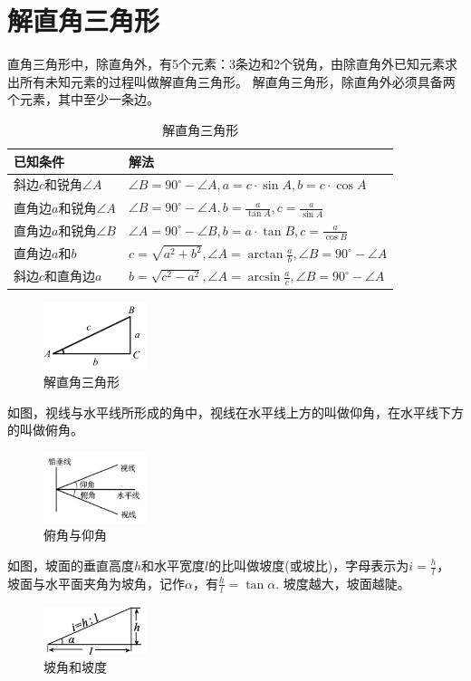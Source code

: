 \documentclass{ecnuthesis}
\begin{document}
\section{解直角三角形}
\begin{knowledge}
    直角三角形中，除直角外，有5个元素：3条边和2个锐角，由除直角外已知元素求出所有未知元素的过程叫做解直角三角形。
    解直角三角形，除直角外必须具备两个元素，其中至少一条边。
\end{knowledge}
\begin{table}[H]
\centering
\caption{解直角三角形}
\begin{tabular}{l|l}
\hline
\hline
已知条件 & 解法 \\
\hline
斜边$c$和锐角$\angle A$ & $\angle B=90^\circ-\angle A,a=c·\sin A,b=c·\cos A$ \\
直角边$a$和锐角$\angle A$ & $\angle B=90^\circ-\angle A,b=\frac{a}{\tan A},c=\frac{a}{\sin A}$ \\
直角边$a$和锐角$\angle B$ & $\angle A=90^\circ-\angle B,b=a·\tan B,c=\frac{a}{\cos B}$ \\
直角边$a$和$b$ & $c=\sqrt{a^2+b^2},\angle A=\arctan \frac{a}{b},\angle B=90^\circ-\angle A$ \\
斜边$c$和直角边$a$ & $b=\sqrt{c^2-a^2},\angle A=\arcsin \frac{a}{c},\angle B=90^\circ-\angle A$ \\
\hline
\hline
\end{tabular}
\end{table}
\begin{figure}[H]
\centering
\includegraphics[width=3cm]{picture/901.png}
\caption{解直角三角形}
\end{figure}
\begin{knowledge}
    如图，视线与水平线所形成的角中，视线在水平线上方的叫做仰角，在水平线下方的叫做俯角。
\end{knowledge}
\begin{figure}[H]
\centering
\includegraphics[width=3cm]{picture/904.png}
\caption{俯角与仰角}
\end{figure}
\begin{knowledge}
    如图，坡面的垂直高度$h$和水平宽度$l$的比叫做坡度(或坡比)，字母表示为$i=\frac{h}{l}$，
    坡面与水平面夹角为坡角，记作$\alpha$，有$\frac{h}{l}=\tan \alpha$. 坡度越大，坡面越陡。\\
\end{knowledge}
\begin{figure}[H]
\centering
\includegraphics[width=3cm]{picture/905.png}
\caption{坡角和坡度}
\end{figure}
\clearpage
\end{document}

